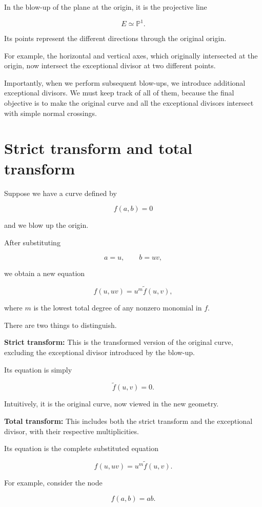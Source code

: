 \documentclass[12pt]{article}
\begin{document}
In the blow-up of the plane at the origin, it is the projective line

\[
E\simeq\mathbb P^1.
\]

Its points represent the different directions through the original
origin.

For example, the horizontal and vertical axes, which originally
intersected at the origin, now intersect the exceptional divisor at two
different points.

Importantly, when we perform subsequent blow-ups, we introduce
additional exceptional divisors. We must keep track of all of them,
because the final objective is to make the original curve and all the
exceptional divisors intersect with simple normal crossings.

\newpage
\section{Strict transform and total
transform}\label{strict-transform-and-total-transform}

Suppose we have a curve defined by

\[
f(a,b)=0
\]

and we blow up the origin.

After substituting

\[
a=u,\qquad b=uv,
\]

we obtain a new equation

\[
f(u,uv)=u^m\widetilde f(u,v),
\]

where \(m\) is the lowest total degree of any nonzero monomial in \(f\).

There are two things to distinguish.

\textbf{Strict transform:} This is the transformed version of the
original curve, excluding the exceptional divisor introduced by the
blow-up.

Its equation is simply

\[
\widetilde f(u,v)=0.
\]

Intuitively, it is the original curve, now viewed in the new geometry.

\textbf{Total transform:} This includes both the strict transform and
the exceptional divisor, with their respective multiplicities.

Its equation is the complete substituted equation

\[
f(u,uv)=u^m\widetilde f(u,v).
\]

For example, consider the node

\[
f(a,b)=ab.
\]
\end{document}
